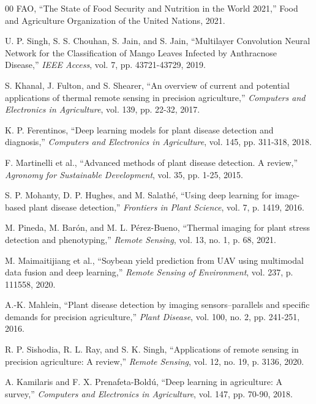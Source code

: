 \documentclass[conference]{IEEEtran}
\begin{document}
\begin{thebibliography}{00}
FAO, ``The State of Food Security and Nutrition in the World 2021,'' Food and Agriculture Organization of the United Nations, 2021.

U. P. Singh, S. S. Chouhan, S. Jain, and S. Jain, ``Multilayer Convolution Neural Network for the Classification of Mango Leaves Infected by Anthracnose Disease,'' \textit{IEEE Access}, vol. 7, pp. 43721-43729, 2019.

S. Khanal, J. Fulton, and S. Shearer, ``An overview of current and potential applications of thermal remote sensing in precision agriculture,'' \textit{Computers and Electronics in Agriculture}, vol. 139, pp. 22-32, 2017.

K. P. Ferentinos, ``Deep learning models for plant disease detection and diagnosis,'' \textit{Computers and Electronics in Agriculture}, vol. 145, pp. 311-318, 2018.

F. Martinelli et al., ``Advanced methods of plant disease detection. A review,'' \textit{Agronomy for Sustainable Development}, vol. 35, pp. 1-25, 2015.

S. P. Mohanty, D. P. Hughes, and M. Salathé, ``Using deep learning for image-based plant disease detection,'' \textit{Frontiers in Plant Science}, vol. 7, p. 1419, 2016.

M. Pineda, M. Barón, and M. L. Pérez-Bueno, ``Thermal imaging for plant stress detection and phenotyping,'' \textit{Remote Sensing}, vol. 13, no. 1, p. 68, 2021.

M. Maimaitijiang et al., ``Soybean yield prediction from UAV using multimodal data fusion and deep learning,'' \textit{Remote Sensing of Environment}, vol. 237, p. 111558, 2020.

A.-K. Mahlein, ``Plant disease detection by imaging sensors–parallels and specific demands for precision agriculture,'' \textit{Plant Disease}, vol. 100, no. 2, pp. 241-251, 2016.

R. P. Sishodia, R. L. Ray, and S. K. Singh, ``Applications of remote sensing in precision agriculture: A review,'' \textit{Remote Sensing}, vol. 12, no. 19, p. 3136, 2020.

A. Kamilaris and F. X. Prenafeta-Boldú, ``Deep learning in agriculture: A survey,'' \textit{Computers and Electronics in Agriculture}, vol. 147, pp. 70-90, 2018.


\end{thebibliography}
\end{document}
